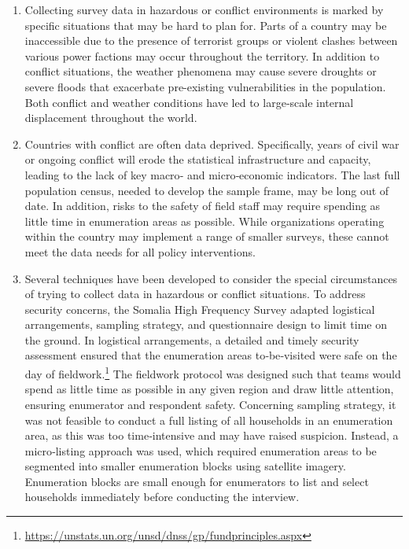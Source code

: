 \documentclass[
]{article}
\begin{document}
\begin{enumerate}
\def\labelenumi{\arabic{enumi}.}
\setcounter{enumi}{348}
\item
  Collecting survey data in hazardous or conflict environments is
  marked by specific situations that may be hard to plan for. Parts of
  a country may be inaccessible due to the presence of terrorist
  groups or violent clashes between various power factions may occur
  throughout the territory. In addition to conflict situations, the
  weather phenomena may cause severe droughts or severe floods that
  exacerbate pre-existing vulnerabilities in the population. Both
  conflict and weather conditions have led to large‐scale internal
  displacement throughout the world.
\item
  Countries with conflict are often data deprived. Specifically,
  years of civil war or ongoing conflict will erode the statistical
  infrastructure and capacity, leading to the lack of key macro‐ and
  micro‐economic indicators. The last full population census, needed
  to develop the sample frame, may be long out of date. In addition,
  risks to the safety of field staff may require spending as little
  time in enumeration areas as possible. While organizations operating
  within the country may implement a range of smaller surveys, these
  cannot meet the data needs for all policy interventions.
\item
  Several techniques have been developed to consider the special
  circumstances of trying to collect data in hazardous or conflict
  situations. To address security concerns, the Somalia High Frequency
  Survey adapted logistical arrangements, sampling strategy, and
  questionnaire design to limit time on the ground. In logistical
  arrangements, a detailed and timely security assessment ensured that
  the enumeration areas to‐be‐visited were safe on the day of
  fieldwork.\footnote{\url{https://unstats.un.org/unsd/dnss/gp/fundprinciples.aspx}} The fieldwork protocol was designed such that teams
  would spend as little time as possible in any given region and draw
  little attention, ensuring enumerator and respondent safety.
  Concerning sampling strategy, it was not feasible to conduct a full
  listing of all households in an enumeration area, as this was too
  time‐intensive and may have raised suspicion. Instead, a
  micro‐listing approach was used, which required enumeration areas to
  be segmented into smaller enumeration blocks using satellite
  imagery. Enumeration blocks are small enough for enumerators to list
  and select households immediately before conducting the interview.

\end{enumerate}
\end{document}
